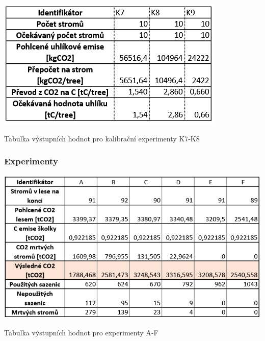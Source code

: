 \documentclass[a4paper, 11pt, titlepage]{article}
\begin{document}
\begin{table}[htb!]
    \centering
    \includegraphics[scale=1]{assets/tab_ke_K7_K9_out.PNG}
    \caption{Tabulka výstupních hodnot pro kalibrační experimenty K7-K8}
    \label{tab:kalibracni_experimenty_vystupy_2}
\end{table}

\newpage
\subsubsection{Experimenty}

\begin{table}[htb!]
    \centering
    \includegraphics[scale=0.8]{assets/tab_e_A_F_out.PNG}
    \caption{Tabulka výstupních hodnot pro experimenty A-F}
    \label{tab:experimenty_vystupy_1}
\end{table}
\end{document}
